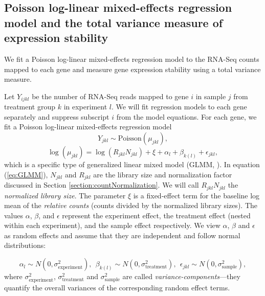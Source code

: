 \documentclass[letterpaper,12pt]{article}
\begin{document}

\subsection{Poisson log-linear mixed-effects regression model and the total
variance measure of expression stability}\label{subsection:OurMethod} 
We fit a Poisson log-linear mixed-effects regression model to the
RNA-Seq counts mapped to each gene and measure gene expression stability using
a total variance measure.

Let $Y_{ijkl}$ be the number of RNA-Seq reads mapped to gene
$i$ in sample $j$ from treatment group $k$  in experiment $l$. We will fit
regression models to each gene separately and suppress subscript $i$ from the
model equations.  For each gene, we fit a Poisson log-linear mixed-effects regression model 
\begin{equation}
  Y_{jkl} \sim \text{Poisson}(\mu_{jkl}),
\end{equation}
\begin{equation}\label{eq:GLMM}
	  \log( \mu_{jkl}) = \log(R_{jkl}N_{jkl})+ \xi + \alpha_l + \beta_{k(l)} + \epsilon_{jkl},
\end{equation}
which is a specific type of generalized linear mixed model (GLMM, \citet{mcculloch2001generalized}). 
In equation (\ref{eq:GLMM}), $N_{jkl}$ and $R_{jkl}$ are the library size and normalization factor discussed in
Section \ref{section:countNormalization}. We will call $R_{jkl}N_{jkl}$ 
the \textit{normalized library size}.
The parameter $\xi$ is a fixed-effect term for the baseline log mean of the {\em relative
counts} (counts divided by the normalized library sizes). 
The values $\alpha$, $\beta$, and $\epsilon$ %
represent the experiment effect, the treatment effect (nested within each
experiment), and the sample effect respectively. 
We view  $\alpha$, $\beta$ and $\epsilon$ as random effects and assume that
they are independent and follow normal distributions:

\begin{equation}\label{eq:normalassumption}
  \alpha_l\sim N(0, \sigma^2_{\text{experiment}}),~~
  \beta_{k(l)}\sim N(0, \sigma^2_{\text{treatment}}),~~
  \epsilon_{jkl}\sim N(0, \sigma_{\text{sample}}^2),
\end{equation}
where $\sigma_{\text{experiment}}^2$, $\sigma_{\text{treatment}}^2$ and
$\sigma_{\text{sample}}^2$ are called \textit{variance-components}---they
quantify the overall variances of the corresponding random effect terms. 
\end{document}
